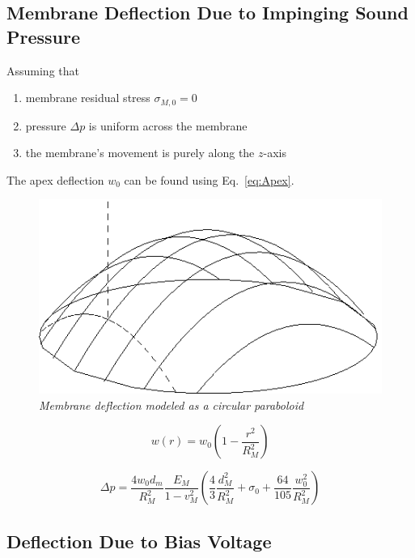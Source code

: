\documentclass[journal]{IEEEtran}
\begin{document}
\subsection{Membrane Deflection Due to Impinging Sound Pressure}

Assuming that
\begin{enumerate}
	\item membrane residual stress $\sigma_{M,0}=0$
	\item pressure $\Delta p$ is uniform across the membrane
	\item the membrane's movement is purely along the $z$-axis
\end{enumerate}

The apex deflection $w_0$ can be found using Eq.~\ref{eq:Apex}.\supercite{schomburg} 

\begin{figure}[ht]
	\centering
	\includegraphics[scale=0.4]{Paraboloid.png}
	\caption{\em Membrane deflection modeled as a circular paraboloid}
	\label{fig:Paraboloid}
\end{figure}

\begin{figure}[ht]
	\begin{equation}
		w(r) = w_0\left(1-\frac{r^2}{R_M^2}\right)
		\label{eq:Deflection}
	\end{equation}
	
	\begin{equation}
		\Delta p = \frac{4w_0 d_m}{R_M^2} \frac{E_M}{1-v_M^2} \left( \frac{4}{3} \frac{d_M^2}{R_M^2} + \sigma_0 + \frac{64}{105} \frac{w_0^2}{R_M^2} \right)
		\label{eq:Apex}
	\end{equation}
\end{figure}


\subsection{Deflection Due to Bias Voltage}
\end{document}
